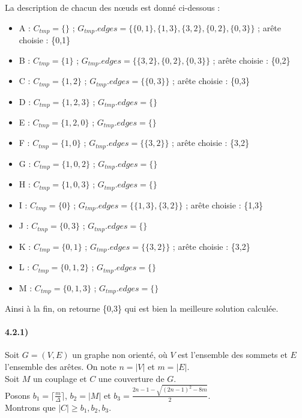 \documentclass[12pt]{article}
\begin{document}
        La description de chacun des nœuds est donné ci-dessous :

        \begin{itemize}
            \item A : $C_{tmp} = \{\}$ ; $G_{tmp}.edges=\{\{0,1\},\{1,3\},\{3,2\},\{0,2\},\{0,3\}\}$ ; arête choisie : \{0,1\}
            \item B : $C_{tmp} = \{1\}$ ; $G_{tmp}.edges=\{\{3,2\},\{0,2\},\{0,3\}\}$ ; arête choisie : \{0,2\}
            \item C : $C_{tmp} = \{1,2\}$ ; $G_{tmp}.edges=\{\{0,3\}\}$ ; arête choisie : \{0,3\}
            \item D : $C_{tmp} = \{1,2,3\}$ ; $G_{tmp}.edges=\{\}$
            \item E : $C_{tmp} = \{1,2,0\}$ ; $G_{tmp}.edges=\{\}$
            \item F : $C_{tmp} = \{1,0\}$ ; $G_{tmp}.edges=\{\{3,2\}\}$ ; arête choisie : \{3,2\}
            \item G : $C_{tmp} = \{1,0,2\}$ ; $G_{tmp}.edges=\{\}$
            \item H : $C_{tmp} = \{1,0,3\}$ ; $G_{tmp}.edges=\{\}$
            \item I : $C_{tmp} = \{0\}$ ; $G_{tmp}.edges=\{\{1,3\},\{3,2\}\}$ ; arête choisie : \{1,3\}
            \item J : $C_{tmp} = \{0,3\}$ ; $G_{tmp}.edges=\{\}$
            \item K : $C_{tmp} = \{0,1\}$ ; $G_{tmp}.edges=\{\{3,2\}\}$ ; arête choisie : \{3,2\}
            \item L : $C_{tmp} = \{0,1,2\}$ ; $G_{tmp}.edges=\{\}$
            \item M : $C_{tmp} = \{0,1,3\}$ ; $G_{tmp}.edges=\{\}$
        \end{itemize}

        Ainsi à la fin, on retourne \{0,3\} qui est bien la meilleure solution calculée.

    \paragraph{4.2.1)}
        Soit $G=(V,E)$ un graphe non orienté, où $V$ est l'ensemble des sommets et $E$ l'ensemble des arêtes. On note $n = |V|$ et $m = |E|$. \\
        Soit $M$ un couplage et $C$ une couverture de $G$. \\
        Posons $b_1 = \lceil \frac{m}{\Delta} \rceil$, $b_2 = |M|$ et $b_3 = \frac{2n-1 - \sqrt{(2n-1)^2 - 8m}}{2}$. \\
        Montrons que $|C| \geq b_1,b_2,b_3$.
\end{document}
